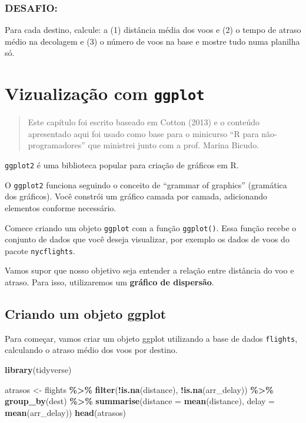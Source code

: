 \documentclass[
]{book}
\newenvironment{Shaded}{\begin{snugshade}}{\end{snugshade}}
\newcommand{\AttributeTok}[1]{\textcolor[rgb]{0.13,0.29,0.53}{#1}}
\newcommand{\FunctionTok}[1]{\textcolor[rgb]{0.13,0.29,0.53}{\textbf{#1}}}
\newcommand{\NormalTok}[1]{#1}
\newcommand{\OtherTok}[1]{\textcolor[rgb]{0.56,0.35,0.01}{#1}}
\newcommand{\SpecialCharTok}[1]{\textcolor[rgb]{0.81,0.36,0.00}{\textbf{#1}}}
\begin{document}
\subsection{DESAFIO:}\label{desafio}

Para cada destino, calcule: a (1) distância média dos voos e (2) o tempo de atraso médio na decolagem e (3) o número de voos na base e mostre tudo numa planilha só.

\chapter{\texorpdfstring{Vizualização com \texttt{ggplot}}{Vizualização com ggplot}}\label{vizualizauxe7uxe3o-com-ggplot}

\begin{quote}
Este capítulo foi escrito baseado em Cotton (2013) e o conteúdo apresentado aqui foi usado como base para o minicurso ``R para não-programadores'' que ministrei junto com a prof. Marina Bicudo.
\end{quote}

\texttt{ggplot2} é uma biblioteca popular para criação de gráficos em R.

O \texttt{ggplot2} funciona seguindo o conceito de ``grammar of graphics'' (gramática dos gráficos). Você constrói um gráfico camada por camada, adicionando elementos conforme necessário.

Comece criando um objeto \texttt{ggplot} com a função \texttt{ggplot()}.
Essa função recebe o conjunto de dados que você deseja visualizar, por exemplo os dados de voos do pacote \texttt{nycflights}.

Vamos supor que nosso objetivo seja entender a relação entre distância do voo e atraso. Para isso, utilizaremos um \textbf{gráfico de dispersão}.

\section{Criando um objeto ggplot}\label{criando-um-objeto-ggplot}

Para começar, vamos criar um objeto ggplot utilizando a base de dados \texttt{flights}, calculando o atraso médio dos voos por destino.

\begin{Shaded}
\begin{Highlighting}[]
\FunctionTok{library}\NormalTok{(tidyverse)}

\NormalTok{atrasos }\OtherTok{\textless{}{-}}\NormalTok{ flights }\SpecialCharTok{\%\textgreater{}\%}
    \FunctionTok{filter}\NormalTok{(}\SpecialCharTok{!}\FunctionTok{is.na}\NormalTok{(distance), }\SpecialCharTok{!}\FunctionTok{is.na}\NormalTok{(arr\_delay)) }\SpecialCharTok{\%\textgreater{}\%}
    \FunctionTok{group\_by}\NormalTok{(dest) }\SpecialCharTok{\%\textgreater{}\%}
    \FunctionTok{summarise}\NormalTok{(}\AttributeTok{distance =} \FunctionTok{mean}\NormalTok{(distance),}
              \AttributeTok{delay =} \FunctionTok{mean}\NormalTok{(arr\_delay))}
\FunctionTok{head}\NormalTok{(atrasos)}
\end{Highlighting}
\end{Shaded}
\end{document}
